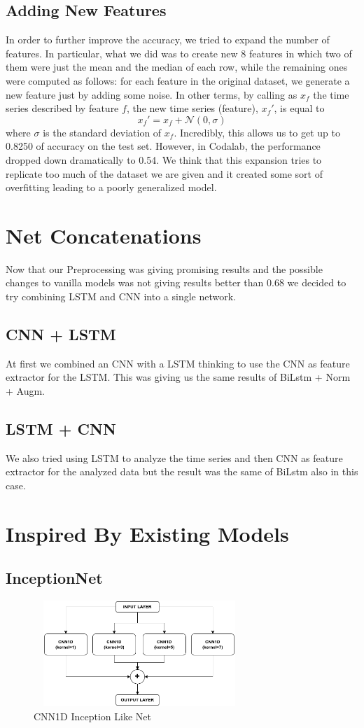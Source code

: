\documentclass[11pt]{article}
\begin{document}
\subsection{Adding New Features}
In order to further improve the accuracy, we tried to expand the number of features. In particular, what we did was to create new 8 features in which two of them were just the mean and the median of each row, while the remaining ones were computed as follows: for each feature in the original dataset, we generate a new feature just by adding some noise. In other terms, by calling as $x_f$ the time series described by feature $f$, the new time series (feature), $x_f'$, is equal to
\begin{equation*}
    x_f' = x_f + \mathcal{N}(0, \sigma)
\end{equation*}
where $\sigma$ is the standard deviation of $x_f$. Incredibly, this allows us to get up to 0.8250 of accuracy on the test set. However, in Codalab, the performance dropped down dramatically to 0.54. We think that this expansion tries to replicate too much of the dataset we are given and it created some sort of overfitting leading to a poorly generalized model.
\section{Net Concatenations}
Now that our Preprocessing was giving promising results and the possible changes to vanilla models was not giving results better than 0.68
we decided to try combining LSTM and CNN into a single network.
\subsection{CNN + LSTM}
At first we combined an CNN with a LSTM thinking to use the CNN as feature extractor for the LSTM.
This was giving us the same results of BiLstm + Norm + Augm.
\subsection{LSTM + CNN}
We also tried using LSTM to analyze the time series and then CNN as feature extractor for the analyzed data
but the result was the same of BiLstm also in this case.

\section{Inspired By Existing Models}
\subsection{InceptionNet}
\begin{figure}[h]
\centering
\includegraphics[width=8cm, height=4cm]{Inception}
\caption{CNN1D Inception Like Net}
\end{figure}
\end{document}
